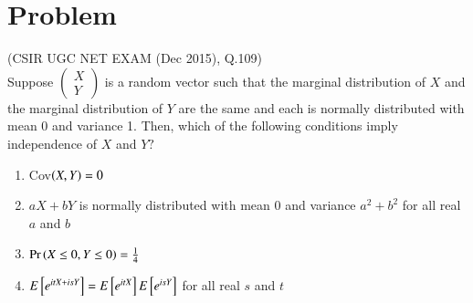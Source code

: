 \documentclass[journal,12pt,twocolumn]{IEEEtran}
\begin{document}
\section{Problem}
(CSIR UGC NET EXAM (Dec 2015), Q.109)\\
Suppose
$\begin{pmatrix}
X\\
Y
\end{pmatrix}$ is a random vector such that the marginal distribution of $X$ and the marginal distribution of $Y$ are the same and each is normally distributed with mean 0 and variance 1. Then, which of the following conditions imply independence of $X$ and $Y?$
\begin{enumerate}
\item Cov$\left(X,Y\right)=0$
\item $aX+bY$ is normally distributed with mean 0 and variance $a^2+b^2$ for all real $a$ and $b$
\item $\Pr\left(X\le 0, Y\le0\right)=\frac{1}{4}$
\item $E{}\left[e^{itX+isY}\right]=E{}\left[e^{itX}\right]E{}\left[e^{isY}\right]$ for all real $s$ and $t$
\end{enumerate}
\end{document}
